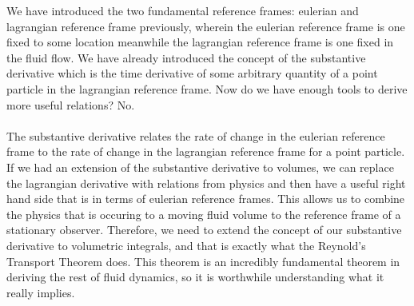 
We have introduced the two fundamental reference frames: eulerian and lagrangian reference frame previously, wherein the eulerian reference frame is one fixed to some location meanwhile the lagrangian reference frame is one fixed in the fluid flow.
We have already introduced the concept of the substantive derivative which is the time derivative of some arbitrary quantity of a point particle in the lagrangian reference frame.
Now do we have enough tools to derive more useful relations? No.
\\~\\The substantive derivative relates the rate of change in the eulerian reference frame to the rate of change in the lagrangian reference frame for a point particle.
If we had an extension of the substantive derivative to volumes, we can replace the lagrangian derivative with relations from physics and then have a useful right hand side that is in terms of eulerian reference frames.
This allows us to combine the physics that is occuring to a moving fluid volume to the reference frame of a stationary observer.
Therefore, we need to extend the concept of our substantive derivative to volumetric integrals, and that is exactly what the Reynold's Transport Theorem does.
This theorem is an incredibly fundamental theorem in deriving the rest of fluid dynamics, so it is worthwhile understanding what it really implies.


